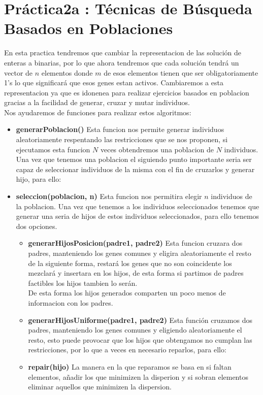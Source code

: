 \section{Práctica2a : Técnicas de Búsqueda Basados en Poblaciones}
En esta practica tendremos que cambiar la representacion de las solución de enteras a binarias, por lo
que ahora tendremos que cada solución tendrá un vector de $n$ elementos donde $m$ de esos elementos tienen que ser
obligatoriamente 1's lo que significará que esos genes estan activos.
Cambiaremos a esta representacion ya que es idonenea para realizar ejercicios basados en poblacion gracias a la facilidad 
de generar, cruzar y mutar individuos.\\

Nos ayudaremos de funciones para realizar estos algoritmos:
\begin{itemize}
  \item \textbf{generarPoblacion()} Esta funcion nos permite generar individuos aleatoriamente respentando las 
  restricciones que se nos proponen, si ejecutamos esta funcion $N$ veces obtendremos una poblacion de $N$ individuos.\\
  Una vez que tenemos una poblacion el siguiendo punto importante seria ser capaz de seleccionar individuos de la misma
   con el fin de cruzarlos y generar hijo, para ello:\\
  \item  \textbf{seleccion(poblacion, n)} Esta funcion nos permitira elegir $n$ individuos de la poblacion.
  Una vez que tenemos a los individuos seleccionados tenemos que generar una seria de hijos de estos individuos seleccionados, 
  para ello tenemos dos opciones.\\
  
  \begin{itemize}
    \item  \textbf{generarHijosPosicion(padre1, padre2)} Esta funcion cruzara dos padres, manteniendo los genes comunes y 
    eligira aleatoriamente el resto de la siguiente forma, restará los genes que no son coincidente los mezclará y insertara en los hijos, de esta 
    forma si partimos de padres factibles los hijos tambien lo serán.\\
    
    De esta forma los hijos generados comparten un poco menos de informacion con los padres.
    \item  \textbf{generarHijosUniforme(padre1, padre2)} Esta función cruzamos dos padres, manteniendo los genes comunes y 
    eligiendo aleatoriamente el resto, esto puede provocar que los hijos que obtengamos no cumplan las restricciones, por lo que 
    a veces en necesario reparlos, para ello:\\
    \item  \textbf{repair(hijo)} La manera en la que reparamos se basa en si faltan elementos,
     añadir los que minimizen la disperion y si sobran elementos eliminar aquellos que minimizen la dispersion.  
  \end{itemize}

\end{itemize}
